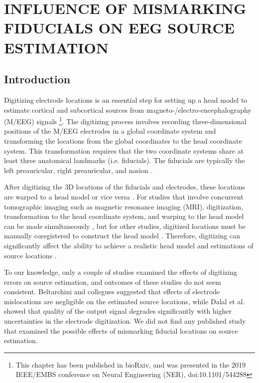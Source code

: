 \documentclass[../thesis_seyed.tex]{subfiles}
\begin{document}
\chapter{INFLUENCE OF MISMARKING FIDUCIALS ON EEG SOURCE ESTIMATION}
\section{Introduction}

Digitizing electrode locations is an essential step for setting up a head model to estimate cortical and subcortical sources from magneto-/electro-encephalography (M/EEG) signals \cite{Koessler2007-qg} \footnote{This chapter has been published in bioRxiv, and was presented in the 2019 IEEE/EMBS conference on Neural Engineering (NER), doi:10.1101/544288}. The digitizing process involves recording three-dimensional positions of the M/EEG electrodes in a global coordinate system and transforming the locations from the global coordinates to the head coordinate system. This transformation requires that the two coordinate systems share at least three anatomical landmarks (i.e. fiducials). The fiducials are typically the left preauricular, right preauricular, and nasion \cite{Koessler2007-qg,Fuchs2007-dd}.

After digitizing the 3D locations of the fiducials and electrodes, these locations are warped to a head model or vice versa \cite{Akalin_Acar2013-rv}. For studies that involve concurrent tomographic imaging such as magnetic resonance imaging (MRI), digitization, transformation to the head coordinate system, and warping to the head model can be made simultaneously \cite{Marino2016-pu}, but for other studies, digitized locations must be manually coregistered to construct the head model \cite{Koessler2007-qg}. Therefore, digitizing can significantly affect the ability to achieve a realistic head model and estimations of source locations \cite{Akalin_Acar2013-rv}.

To our knowledge, only a couple of studies examined the effects of digitizing errors on source estimation, and outcomes of these studies do not seem consistent. Beltarchini and collegues \cite{Beltrachini2011-je} suggested that effects of electrode mislocations are negligible on the estimated source locations, while Dalal et al. \cite{Dalal2014-nk} showed that quality of the output signal degrades significantly with higher uncertainties in the electrode digitization. We did not find any published study that examined the possible effects of mismarking fiducial locations on source estimation.
\end{document}
